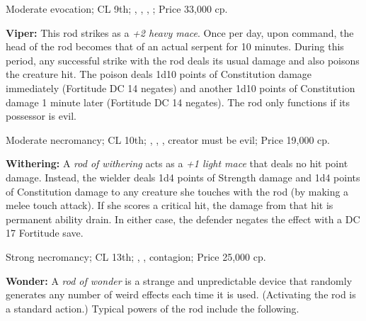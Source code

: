 Moderate evocation; CL 9th; , , , ; Price 33,000 cp.

\textbf{Viper:} This rod strikes as a \emph{+2 heavy mace}. Once per day, upon command, the head of the rod becomes that of an actual serpent for 10 minutes. During this period, any successful strike with the rod deals its usual damage and also poisons the creature hit. The poison deals 1d10 points of Constitution damage immediately (Fortitude DC 14 negates) and another 1d10 points of Constitution damage 1 minute later (Fortitude DC 14 negates). The rod only functions if its possessor is evil.

Moderate necromancy; CL 10th; , , , creator must be evil; Price 19,000 cp.

\textbf{Withering:} A \emph{rod of withering} acts as a \emph{+1 light mace} that deals no hit point damage. Instead, the wielder deals 1d4 points of Strength damage and 1d4 points of Constitution damage to any creature she touches with the rod (by making a melee touch attack). If she scores a critical hit, the damage from that hit is permanent ability drain. In either case, the defender negates the effect with a DC 17 Fortitude save.

Strong necromancy; CL 13th; , , contagion; Price 25,000 cp.

\textbf{Wonder:} A \emph{rod of wonder} is a strange and unpredictable device that randomly generates any number of weird effects each time it is used. (Activating the rod is a standard action.) Typical powers of the rod include the following.

